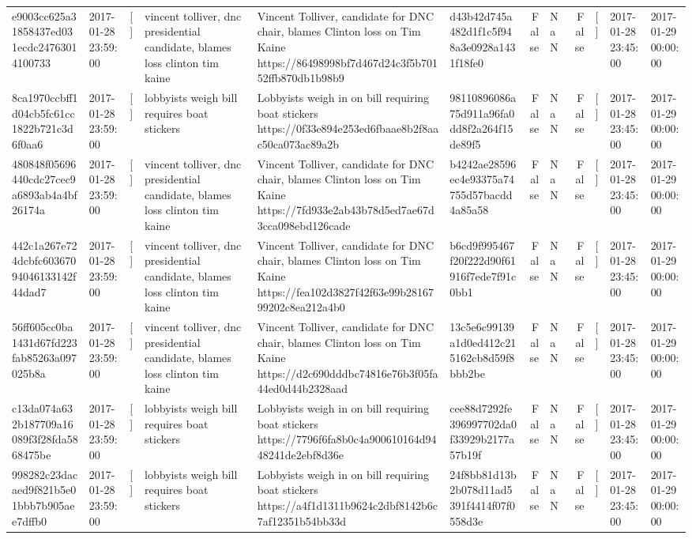 \begin{tabular}{llllllrlrlll}
e9003cc625a31858437ed031ecdc24763014100733 & 2017-01-28 23:59:00 & [] & vincent tolliver, dnc presidential candidate, blames loss clinton tim kaine & Vincent Tolliver, candidate for DNC chair, blames Clinton loss on Tim Kaine https://86498998bf7d467d24c3f5b70152ffb870db1b98b9 & d43b42d745a482d1f1c5f948a3e0928a1431f18fe0 & False & NaN & False & [] & 2017-01-28 23:45:00 & 2017-01-29 00:00:00 \\
8ca1970ccbff1d04cb5fc61cc1822b721c3d6f0aa6 & 2017-01-28 23:59:00 & [] & lobbyists weigh bill requires boat stickers & Lobbyists weigh in on bill requiring boat stickers https://0f33e894e253ed6fbaae8b2f8aac50ca073ac89a2b & 98110896086a75d911a96fa0dd8f2a264f15de89f5 & False & NaN & False & [] & 2017-01-28 23:45:00 & 2017-01-29 00:00:00 \\
480848f05696440cdc27cec9a6893ab4a4bf26174a & 2017-01-28 23:59:00 & [] & vincent tolliver, dnc presidential candidate, blames loss clinton tim kaine & Vincent Tolliver, candidate for DNC chair, blames Clinton loss on Tim Kaine https://7fd933e2ab43b78d5ed7ae67d3cca098ebd126cade & b4242ae28596ec4e93375a74755d57bacdd4a85a58 & False & NaN & False & [] & 2017-01-28 23:45:00 & 2017-01-29 00:00:00 \\
442c1a267e724dcbfc60367094046133142f44dad7 & 2017-01-28 23:59:00 & [] & vincent tolliver, dnc presidential candidate, blames loss clinton tim kaine & Vincent Tolliver, candidate for DNC chair, blames Clinton loss on Tim Kaine https://fea102d3827f42f63e99b2816799202c8ea212a4b0 & b6cd9f995467f20f222d90f61916f7ede7f91c0bb1 & False & NaN & False & [] & 2017-01-28 23:45:00 & 2017-01-29 00:00:00 \\
56ff605cc0ba1431d67fd223fab85263a097025b8a & 2017-01-28 23:59:00 & [] & vincent tolliver, dnc presidential candidate, blames loss clinton tim kaine & Vincent Tolliver, candidate for DNC chair, blames Clinton loss on Tim Kaine https://d2c690dddbc74816e76b3f05fa44ed0d44b2328aad & 13c5e6c99139a1d0ed412c215162cb8d59f8bbb2be & False & NaN & False & [] & 2017-01-28 23:45:00 & 2017-01-29 00:00:00 \\
c13da074a632b187709a16089f3f28fda5868475be & 2017-01-28 23:59:00 & [] & lobbyists weigh bill requires boat stickers & Lobbyists weigh in on bill requiring boat stickers https://7796f6fa8b0c4a900610164d9448241de2ebf8d36e & cee88d7292fe396997702da0f33929b2177a57b19f & False & NaN & False & [] & 2017-01-28 23:45:00 & 2017-01-29 00:00:00 \\
998282c23dacaed9f821b5e01bbb7b905aee7dffb0 & 2017-01-28 23:59:00 & [] & lobbyists weigh bill requires boat stickers & Lobbyists weigh in on bill requiring boat stickers https://a4f1d1311b9624c2dbf8142b6c7af12351b54bb33d & 24f8bb81d13b2b078d11ad5391f4414f07f0558d3e & False & NaN & False & [] & 2017-01-28 23:45:00 & 2017-01-29 00:00:00 \\

\end{tabular}

